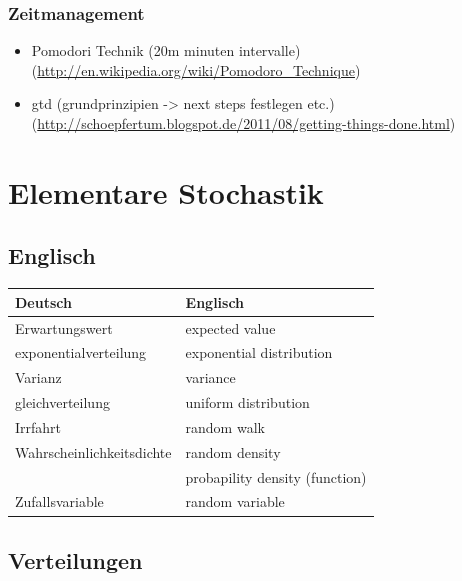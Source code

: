 \documentclass[11pt]{article}
\begin{document}
\subsubsection{Zeitmanagement}
\label{sec-2-3-7}

\begin{itemize}
\item Pomodori Technik (20m minuten intervalle) (\href{http://en.wikipedia.org/wiki/Pomodoro_Technique}{http://en.wikipedia.org/wiki/Pomodoro\_Technique})
\item gtd (grundprinzipien -> next steps festlegen etc.)(\href{http://schoepfertum.blogspot.de/2011/08/getting-things-done.html}{http://schoepfertum.blogspot.de/2011/08/getting-things-done.html})
\end{itemize}
\section{Elementare Stochastik}
\label{sec-3}
\subsection{Englisch}
\label{sec-3-1}


\begin{center}
\begin{tabular}{ll}
 Deutsch                    &  Englisch                        \\
\hline
 Erwartungswert             &  expected value                  \\
 exponentialverteilung      &  exponential distribution        \\
 Varianz                    &  variance                        \\
 gleichverteilung           &  uniform distribution            \\
 Irrfahrt                   &  random walk                     \\
 Wahrscheinlichkeitsdichte  &  random density                  \\
                            &  probapility density (function)  \\
 Zufallsvariable            &  random variable                 \\
\end{tabular}
\end{center}
\subsection{Verteilungen}
\label{sec-3-2}
\end{document}
